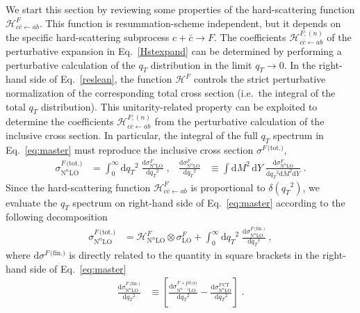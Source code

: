 \documentclass[12pt]{article}
\DeclareRobustCommand{\qt}{\ensuremath{q_T}\xspace}
\DeclareRobustCommand{\rd}{\ensuremath{\mathrm{d}}}
\DeclareRobustCommand{\cH}{\ensuremath{\mathcal{H}}}
\DeclareRobustCommand{\jets}{\text{jet(s)}\xspace}
\DeclareRobustCommand{\CT}{\text{CT}\xspace}
\DeclareRobustCommand{\fin}{\text{(fin.)}\xspace}
\DeclareRobustCommand{\tot}{\text{(tot.)}\xspace}
\DeclareRobustCommand{\LO}{\text{LO}\xspace}
\DeclareRobustCommand{\N}[1]{\ensuremath{\text{N}^{#1}}} %
\begin{document}
We start this section by reviewing some properties of the hard-scattering function $\cH_{c{\bar c} \gets ab}^{F}$. 
This function is resummation-scheme independent, but it depends on the specific hard-scattering subprocess $c + {\bar c} \to F$. 
The coefficients $\cH_{c{\bar c} \gets ab}^{F;(n)}$ of the perturbative expansion in Eq.~\eqref{Hstexpand} can be determined by performing a perturbative calculation of the $\qt$ distribution in the limit $\qt \to 0$. 
In the right-hand side of Eq.~\eqref{reslean}, the function $\cH^{F}$ controls the strict perturbative normalization of the corresponding total cross section (i.e.\ the integral of the total $\qt$ distribution). 
This unitarity-related property can be exploited to determine the coefficients $\cH_{c{\bar c} \gets ab}^{F ;(n)}$ from the perturbative calculation of the inclusive cross section.  
In particular, the integral of the full $\qt$ spectrum in Eq.~\eqref{eq:master} must reproduce the inclusive cross section $\sigma^{F\,\tot}$,
\begin{align}
  \sigma^{F\,\tot}_{\N{n}\LO}
  &=
  \int_0^\infty\rd\qt^2 \; \frac{\rd\sigma^{F}_{\N{n}\LO}}{\rd\qt^2} \;, 
  &
  \frac{\rd\sigma^{F}_{\N{n}\LO}}{\rd\qt^2}
  &\equiv
  \int\rd M^2 \, \rd Y \;
  \frac{\rd\sigma^{F}_{\N{n}\LO}}{\rd\qt^2\rd M^2\rd Y} \;.
  \label{restotp}
\end{align}
Since the hard-scattering function $\cH_{c\bar{c}\gets ab}^{F}$ is proportional to $\delta(\qt^{2})$, we evaluate the $\qt$ spectrum on right-hand side of Eq.~\eqref{eq:master} according to the following decomposition \cite{Bozzi:2005wk}
\begin{align}
  \sigma^{F\,\tot}_{\N{n}\LO}
  &=
  \cH^F_{\N{n}\LO} \otimes \sigma^F_{\LO} + 
  \int_0^\infty\rd\qt^2 \; \frac{\rd\sigma^{F\,\fin}_{\N{n}\LO}}{\rd\qt^2} \;, 
  \label{sigtotrel} 
\end{align}
where $\rd{\sigma}^{F\,\fin}$ is directly related to the quantity in square brackets in the right-hand side of Eq.~\eqref{eq:master}
\begin{align}
  \frac{\rd\sigma^{F\,\fin}_{\N{n}\LO}}{\rd\qt^2}
  &\equiv
  \left[
    \frac{\rd\sigma^{F+\jets}_{\N{n-1}\LO}}{\rd\qt^2} -
    \frac{\rd\sigma^{F\,\CT}_{\N{n}\LO}}{\rd\qt^2} 
  \right]
  \; .
  \label{sigfin}
\end{align}
\end{document}
